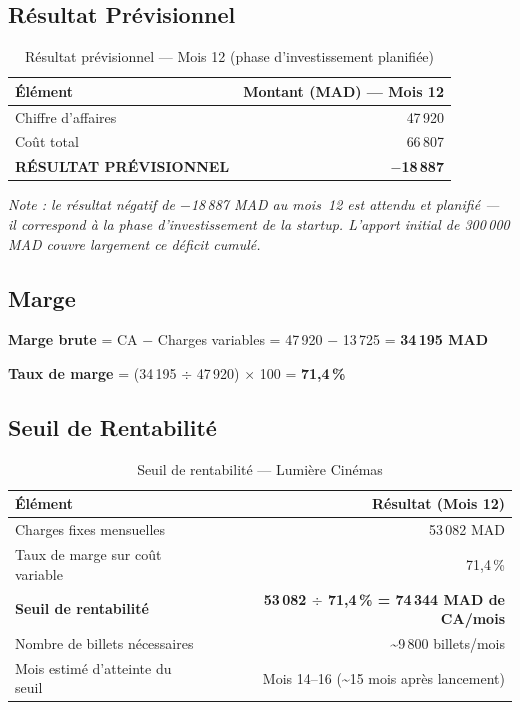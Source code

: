 \documentclass[12pt,a4paper,openany]{report}
\begin{document}
\subsection{Résultat Prévisionnel}

\begin{table}[H]
\centering
\small
\begin{tabular}{lr}
\toprule
\textbf{Élément} & \textbf{Montant (MAD) — Mois 12} \\
\midrule
Chiffre d'affaires & 47\,920 \\
Coût total         & 66\,807 \\
\midrule
\textbf{RÉSULTAT PRÉVISIONNEL} & \textbf{$-$18\,887} \\
\bottomrule
\end{tabular}
\caption{Résultat prévisionnel — Mois 12 (phase d'investissement planifiée)}
\label{tab:resultat}
\end{table}

\noindent\textit{Note : le résultat négatif de $-$18\,887 MAD au mois~12 est attendu et planifié — il correspond à la phase d'investissement de la startup. L'apport initial de 300\,000 MAD couvre largement ce déficit cumulé.}

\subsection{Marge}

\noindent\textbf{Marge brute} = CA $-$ Charges variables = 47\,920 $-$ 13\,725 = \textbf{34\,195 MAD}

\noindent\textbf{Taux de marge} = (34\,195 $\div$ 47\,920) $\times$ 100 = \textbf{71,4\,\%}

\subsection{Seuil de Rentabilité}

\begin{table}[H]
\centering
\small
\begin{tabular}{lr}
\toprule
\textbf{Élément} & \textbf{Résultat (Mois 12)} \\
\midrule
Charges fixes mensuelles          & 53\,082 MAD \\
Taux de marge sur coût variable   & 71,4\,\% \\
\textbf{Seuil de rentabilité}     & \textbf{53\,082 $\div$ 71,4\,\% = 74\,344 MAD de CA/mois} \\
Nombre de billets nécessaires     & \textasciitilde{}9\,800 billets/mois \\
Mois estimé d'atteinte du seuil   & Mois 14–16 (\textasciitilde{}15 mois après lancement) \\
\bottomrule
\end{tabular}
\caption{Seuil de rentabilité — Lumière Cinémas}
\label{tab:seuil}
\end{table}
\end{document}
